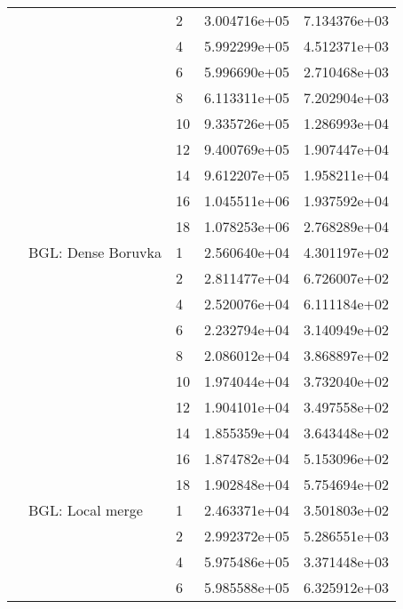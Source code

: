 \begin{tabular}{lllrr}
                      &            & 2  &  3.004716e+05 &  7.134376e+03 \\
                      &            & 4  &  5.992299e+05 &  4.512371e+03 \\
                      &            & 6  &  5.996690e+05 &  2.710468e+03 \\
                      &            & 8  &  6.113311e+05 &  7.202904e+03 \\
                      &            & 10 &  9.335726e+05 &  1.286993e+04 \\
                      &            & 12 &  9.400769e+05 &  1.907447e+04 \\
                      &            & 14 &  9.612207e+05 &  1.958211e+04 \\
                      &            & 16 &  1.045511e+06 &  1.937592e+04 \\
                      &            & 18 &  1.078253e+06 &  2.768289e+04 \\
                      & BGL: Dense Boruvka & 1  &  2.560640e+04 &  4.301197e+02 \\
                      &            & 2  &  2.811477e+04 &  6.726007e+02 \\
                      &            & 4  &  2.520076e+04 &  6.111184e+02 \\
                      &            & 6  &  2.232794e+04 &  3.140949e+02 \\
                      &            & 8  &  2.086012e+04 &  3.868897e+02 \\
                      &            & 10 &  1.974044e+04 &  3.732040e+02 \\
                      &            & 12 &  1.904101e+04 &  3.497558e+02 \\
                      &            & 14 &  1.855359e+04 &  3.643448e+02 \\
                      &            & 16 &  1.874782e+04 &  5.153096e+02 \\
                      &            & 18 &  1.902848e+04 &  5.754694e+02 \\
                      & BGL: Local merge & 1  &  2.463371e+04 &  3.501803e+02 \\
                      &            & 2  &  2.992372e+05 &  5.286551e+03 \\
                      &            & 4  &  5.975486e+05 &  3.371448e+03 \\
                      &            & 6  &  5.985588e+05 &  6.325912e+03 \\

\end{tabular}

